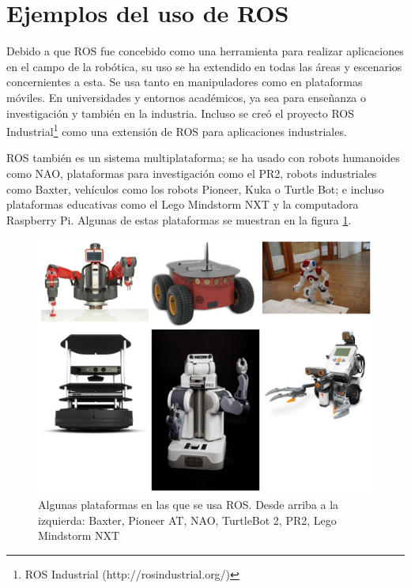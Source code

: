 \section{Ejemplos del uso de ROS}

Debido a que ROS fue concebido como una herramienta para realizar aplicaciones en el campo de la robótica, su uso se ha extendido en todas las áreas y escenarios concernientes a esta. Se usa tanto en manipuladores como en plataformas móviles. En universidades y entornos académicos, ya sea para enseñanza o investigación y también en la industria. Incluso se creó el proyecto ROS Industrial\footnote{ROS Industrial (http://rosindustrial.org/)} como una extensión de ROS para aplicaciones industriales.

ROS también es un sistema multiplataforma; se ha usado con robots humanoides como NAO, plataformas para investigación como el PR2, robots industriales como Baxter, vehículos como los robots Pioneer, Kuka o Turtle Bot; e incluso plataformas educativas como el Lego Mindstorm NXT y la computadora Raspberry Pi. Algunas de estas plataformas se muestran en la figura \ref{robots}.


\begin{figure}[!ht]
\centering
\includegraphics[scale=0.25]{img/robots.jpg}
\caption{Algunas plataformas en las que se usa ROS. Desde arriba a la izquierda: Baxter, Pioneer AT, NAO, TurtleBot 2, PR2, Lego Mindstorm NXT}
\label{robots}
\end{figure} 
